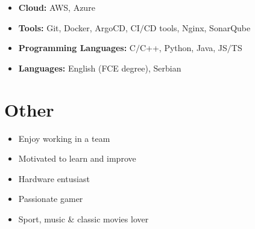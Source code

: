 \documentclass[a4paper]{moderncv}
\begin{document}
	\begin{itemize}
		
		\item \textbf{Cloud: } AWS, Azure
		\item \textbf{Tools: } Git, Docker, ArgoCD, CI$\slash$CD tools, Nginx, SonarQube
		\item \textbf{Programming Languages: } C$\slash$C++, Python, Java, JS$\slash$TS		
		\item \textbf{Languages: } English (FCE degree), Serbian
		
	\end{itemize}
%
%
\section{Other}
	\vspace{-1em}
	\begin{multicols*}{2}
		\begin{itemize}
			\setlength\itemsep{-1.2pt}
			\item Enjoy working in a team
			\item Motivated to learn and improve
			\item Hardware entusiast
			\item Passionate gamer
			\item Sport, music \& classic movies lover
		\end{itemize}		
	\end{multicols*}
	
\end{document}
